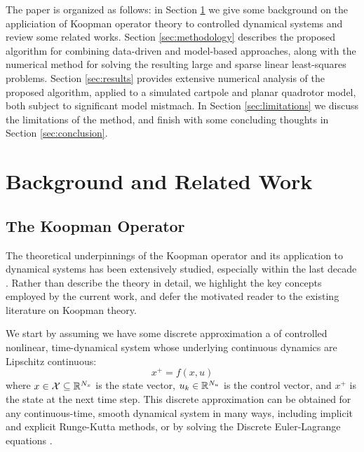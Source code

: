 \documentclass{article}
\begin{document}
    The paper is organized as follows: in Section \ref{sec:Preliminaries/Background} we 
    give some background on the appliciation of Koopman operator theory to controlled 
    dynamical systems and review some related works. Section \ref{sec:methodology} describes
    the proposed algorithm for combining data-driven and model-based approaches, along with 
    the numerical method for solving the resulting large and sparse linear least-squares 
    problems. Section \ref{sec:results} provides extensive numerical analysis of the 
    proposed algorithm, applied to a simulated cartpole and planar quadrotor model, both 
    subject to significant model mistmach. In Section \ref{sec:limitations} we discuss the 
    limitations of the method, and finish with some concluding thoughts in Section 
    \ref{sec:conclusion}.

\section{Background and Related Work} \label{sec:Preliminaries/Background}

  \subsection{The Koopman Operator}
  The theoretical underpinnings of the Koopman operator and its application to dynamical
  systems has been extensively studied, especially within the last decade 
  \cite{Fasel2021,Proctor2018,Bruder2021,Williams2015}. Rather than describe the theory in
  detail, we highlight the key concepts employed by the current work, and defer the
  motivated reader to the existing literature on Koopman theory.

  We start by assuming we have some discrete approximation a of controlled nonlinear,
  time-dynamical system whose underlying continuous dynamics are Lipschitz continuous:
  \begin{equation} \label{eq:discrete_dynamics} 
    x^+ = f(x, u) 
  \end{equation} 
  where $x \in \mathcal{X} \subseteq \mathbb{R}^{N_x}$ is the state vector, $u_k \in \mathbb{R}^{N_u}$ is
  the control vector, and $x^+$ is the state at the next time step. This discrete
  approximation can be obtained for any continuous-time, smooth dynamical system in many
  ways, including implicit and explicit Runge-Kutta methods, or by solving the Discrete
  Euler-Lagrange equations \cite{Brudigam2021a,Brudigam2021,Howell2022}.
\end{document}
